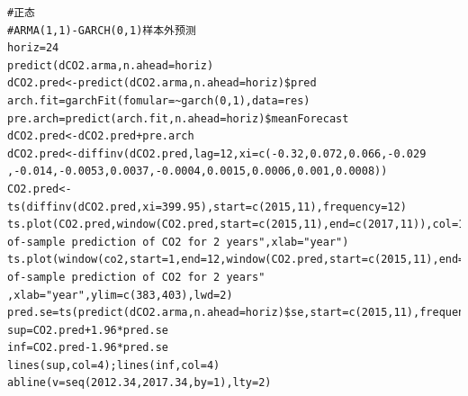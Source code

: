 \documentclass[a4paper,11pt]{article}
\begin{document}
\begin{verbatim}
#正态
#ARMA(1,1)-GARCH(0,1)样本外预测 
horiz=24 
predict(dCO2.arma,n.ahead=horiz) 
dCO2.pred<-predict(dCO2.arma,n.ahead=horiz)$pred 
arch.fit=garchFit(fomular=~garch(0,1),data=res) 
pre.arch=predict(arch.fit,n.ahead=horiz)$meanForecast 
dCO2.pred<-dCO2.pred+pre.arch 
dCO2.pred<-diffinv(dCO2.pred,lag=12,xi=c(-0.32,0.072,0.066,-0.029 ,-0.014,-0.0053,0.0037,-0.0004,0.0015,0.0006,0.001,0.0008)) 
CO2.pred<-ts(diffinv(dCO2.pred,xi=399.95),start=c(2015,11),frequency=12) 
ts.plot(CO2.pred,window(CO2.pred,start=c(2015,11),end=c(2017,11)),col=1:2,main="out-of-sample prediction of CO2 for 2 years",xlab="year") 
ts.plot(window(co2,start=1,end=12,window(CO2.pred,start=c(2015,11),end=c(2017,11)),col=1:2,main="out-of-sample prediction of CO2 for 2 years" ,xlab="year",ylim=c(383,403),lwd=2) 
pred.se=ts(predict(dCO2.arma,n.ahead=horiz)$se,start=c(2015,11),frequency=12) 
sup=CO2.pred+1.96*pred.se 
inf=CO2.pred-1.96*pred.se 
lines(sup,col=4);lines(inf,col=4) 
abline(v=seq(2012.34,2017.34,by=1),lty=2)


\end{verbatim}
\end{document}
